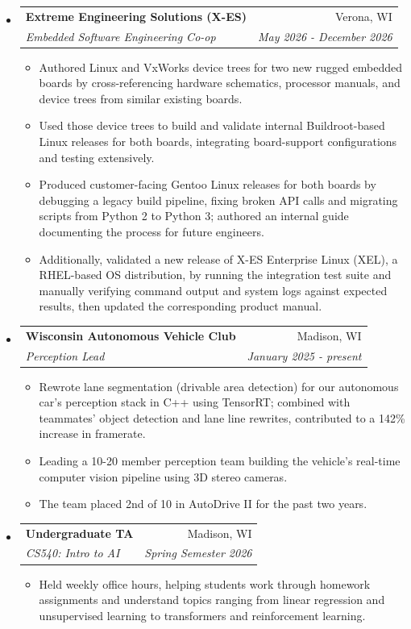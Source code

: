 \documentclass[letterpaper,11pt]{article}
\makeatletter
\newcommand{\resitem}[1]{\item #1 \vspace{-2pt}}
\newcommand{\resheading}[1]{\vspace{6pt}{\large \colorbox{mygrey}{\begin{minipage}{\textwidth}{\textbf{#1 \vphantom{p\^{E}}}}\end{minipage}}}}
\newcommand{\ressubheading}[4]{
  \begin{tabular*}{7.0in}{l@{\extracolsep{\fill}}r}
    \textbf{#1} & #2 \\
    \textit{#3} & \textit{#4} \\
  \end{tabular*}\vspace{3pt}}
\makeatother
\begin{document}
\resheading{Relevant Experience}
\begin{itemize}

\item
  \ressubheading{Extreme Engineering Solutions (X-ES)}{Verona, WI}{Embedded Software Engineering Co-op}{May 2026 - December 2026}
  \begin{itemize}
    \resitem{Authored Linux and VxWorks device trees for two new rugged embedded boards by cross-referencing hardware schematics, processor manuals, and device trees from similar existing boards.}
    \resitem{Used those device trees to build and validate internal Buildroot-based Linux releases for both boards, integrating board-support configurations and testing extensively.}
    \resitem{Produced customer-facing Gentoo Linux releases for both boards by debugging a legacy build pipeline, fixing broken API calls and migrating scripts from Python 2 to Python 3; authored an internal guide documenting the process for future engineers.}
    \resitem{Additionally, validated a new release of X-ES Enterprise Linux (XEL), a RHEL-based OS distribution, by running the integration test suite and manually verifying command output and system logs against expected results, then updated the corresponding product manual.}
  \end{itemize}

\item
  \ressubheading{Wisconsin Autonomous Vehicle Club}{Madison, WI}{Perception Lead}{January 2025 - present}
  \begin{itemize}
    \resitem{Rewrote lane segmentation (drivable area detection) for our autonomous car's perception stack in C++ using TensorRT; combined with teammates' object detection and lane line rewrites, contributed to a 142\% increase in framerate.}
    \resitem{Leading a 10-20 member perception team building the vehicle's real-time computer vision pipeline using 3D stereo cameras.}
    \resitem{The team placed 2nd of 10 in AutoDrive II for the past two years.}
  \end{itemize}

\item
  \ressubheading{Undergraduate TA}{Madison, WI}{CS540: Intro to AI}{Spring Semester 2026}
  \begin{itemize}
    \resitem{Held weekly office hours, helping students work through homework assignments and understand topics ranging from linear regression and unsupervised learning to transformers and reinforcement learning.}
  \end{itemize}



\end{itemize}
\end{document}
